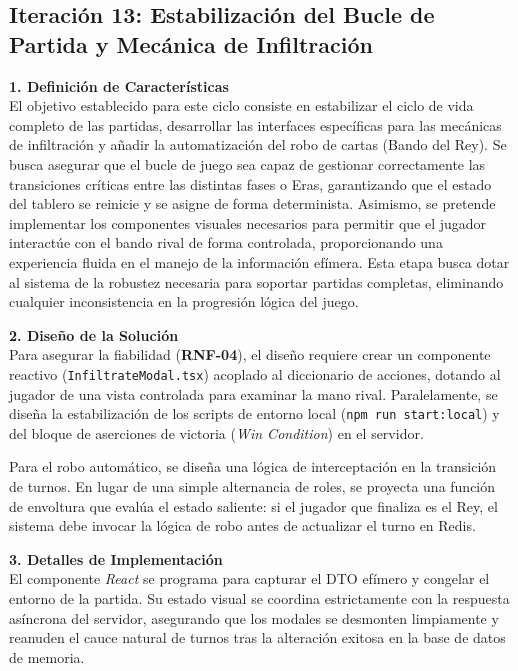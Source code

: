 \subsection{Iteración 13: Estabilización del Bucle de Partida y Mecánica de Infiltración}

\textbf{1. Definición de Características} \\
El objetivo establecido para este ciclo consiste en estabilizar el ciclo de vida completo de las partidas, desarrollar las interfaces específicas para las mecánicas de infiltración y añadir la automatización del robo de cartas (Bando del Rey). Se busca asegurar que el bucle de juego sea capaz de gestionar correctamente las transiciones críticas entre las distintas fases o Eras, garantizando que el estado del tablero se reinicie y se asigne de forma determinista. Asimismo, se pretende implementar los componentes visuales necesarios para permitir que el jugador interactúe con el bando rival de forma controlada, proporcionando una experiencia fluida en el manejo de la información efímera. Esta etapa busca dotar al sistema de la robustez necesaria para soportar partidas completas, eliminando cualquier inconsistencia en la progresión lógica del juego.

\textbf{2. Diseño de la Solución} \\
Para asegurar la fiabilidad (\textbf{RNF-04}), el diseño requiere crear un componente reactivo (\texttt{InfiltrateModal.tsx}) acoplado al diccionario de acciones, dotando al jugador de una vista controlada para examinar la mano rival. Paralelamente, se diseña la estabilización de los scripts de entorno local (\texttt{npm run start:local}) y del bloque de aserciones de victoria (\textit{Win Condition}) en el servidor.

Para el robo automático, se diseña una lógica de interceptación en la transición de turnos. En lugar de una simple alternancia de roles, se proyecta una función de envoltura que evalúa el estado saliente: si el jugador que finaliza es el Rey, el sistema debe invocar la lógica de robo antes de actualizar el turno en Redis.

\textbf{3. Detalles de Implementación} \\
El componente \textit{React} se programa para capturar el DTO efímero y congelar el entorno de la partida. Su estado visual se coordina estrictamente con la respuesta asíncrona del servidor, asegurando que los modales se desmonten limpiamente y reanuden el cauce natural de turnos tras la alteración exitosa en la base de datos de memoria.

